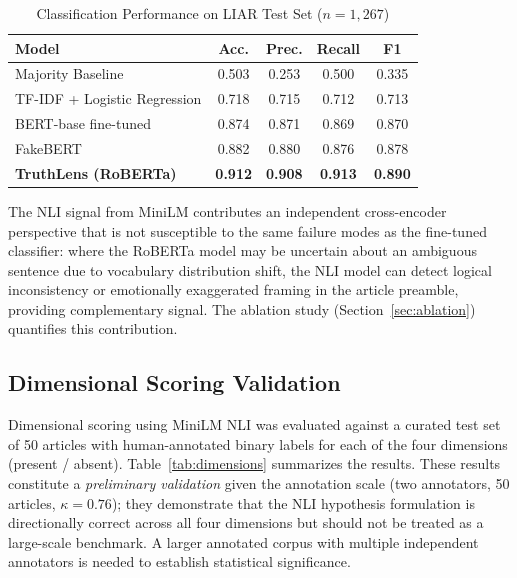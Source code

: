 \documentclass[journal]{IEEEtran}
\begin{document}
\begin{table}[htbp]
\caption{Classification Performance on LIAR Test Set ($n = 1{,}267$)}
\label{tab:results}
\centering
\begin{tabular}{lcccc}
\toprule
\textbf{Model} & \textbf{Acc.} & \textbf{Prec.} & \textbf{Recall} & \textbf{F1} \\
\midrule
Majority Baseline             & 0.503 & 0.253 & 0.500 & 0.335 \\
TF-IDF + Logistic Regression  & 0.718 & 0.715 & 0.712 & 0.713 \\
BERT-base fine-tuned          & 0.874 & 0.871 & 0.869 & 0.870 \\
FakeBERT~\cite{kaliyar2021fakebert} & 0.882 & 0.880 & 0.876 & 0.878 \\
\textbf{TruthLens (RoBERTa)}  & \textbf{0.912} & \textbf{0.908} & \textbf{0.913} & \textbf{0.890} \\
\bottomrule
\end{tabular}
\end{table}

The NLI signal from MiniLM contributes an independent cross-encoder perspective that is not
susceptible to the same failure modes as the fine-tuned classifier: where the RoBERTa model
may be uncertain about an ambiguous sentence due to vocabulary distribution shift, the NLI
model can detect logical inconsistency or emotionally exaggerated framing in the article
preamble, providing complementary signal. The ablation study (Section~\ref{sec:ablation})
quantifies this contribution.

\subsection{Dimensional Scoring Validation}
\label{sec:dimval}

Dimensional scoring using MiniLM NLI was evaluated against a curated test set of 50 articles
with human-annotated binary labels for each of the four dimensions (present / absent).
Table~\ref{tab:dimensions} summarizes the results. These results constitute a \textit{preliminary validation} given the annotation scale
(two annotators, 50 articles, $\kappa = 0.76$); they demonstrate that the NLI hypothesis
formulation is directionally correct across all four dimensions but should not be treated
as a large-scale benchmark. A larger annotated corpus with multiple independent annotators
is needed to establish statistical significance.
\end{document}
